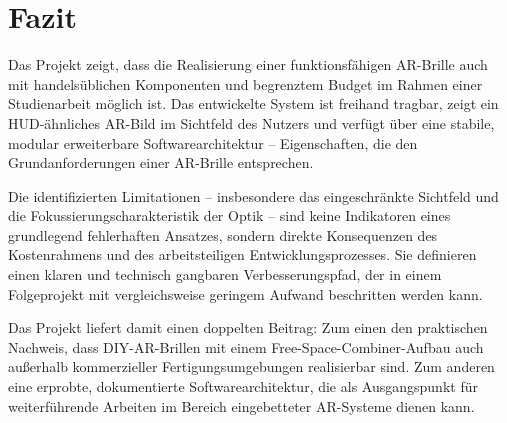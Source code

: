 \section{Fazit}
\label{sec:Fazit}

Das Projekt zeigt, dass die Realisierung einer funktionsfähigen
AR-Brille auch mit handelsüblichen Komponenten und begrenztem Budget
im Rahmen einer Studienarbeit möglich ist.
Das entwickelte System ist freihand tragbar, zeigt ein HUD-ähnliches
AR-Bild im Sichtfeld des Nutzers und verfügt über eine stabile,
modular erweiterbare Softwarearchitektur -- Eigenschaften, die den
Grundanforderungen einer AR-Brille entsprechen.

Die identifizierten Limitationen -- insbesondere das eingeschränkte
Sichtfeld und die Fokussierungscharakteristik der Optik -- sind
keine Indikatoren eines grundlegend fehlerhaften Ansatzes, sondern
direkte Konsequenzen des Kostenrahmens und des arbeitsteiligen
Entwicklungsprozesses.
Sie definieren einen klaren und technisch gangbaren Verbesserungspfad,
der in einem Folgeprojekt mit vergleichsweise geringem Aufwand
beschritten werden kann.

Das Projekt liefert damit einen doppelten Beitrag:
Zum einen den praktischen Nachweis, dass DIY-AR-Brillen mit
einem Free-Space-Combiner-Aufbau auch außerhalb kommerzieller
Fertigungsumgebungen realisierbar sind.
Zum anderen eine erprobte, dokumentierte Softwarearchitektur,
die als Ausgangspunkt für weiterführende Arbeiten im Bereich
eingebetteter AR-Systeme dienen kann.


